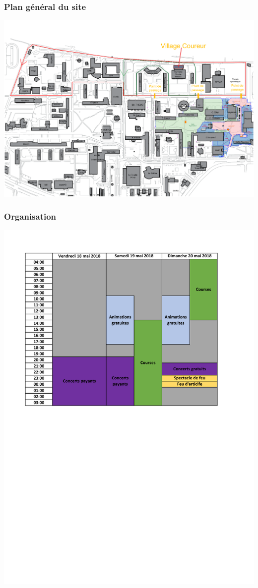 \documentclass{beamer}
\begin{document}
\begin{frame}

\frametitle{Plan général du site}

\centering\includegraphics[height=.8\textheight, trim=150 70 0 0,clip]{Exports/Plan_24h_43eme-Parcours_courses}

\end{frame}

\begin{frame}

\frametitle{Organisation}

\centering\includegraphics[width=\textwidth]{Images/Timeline}

\end{frame}
\end{document}
